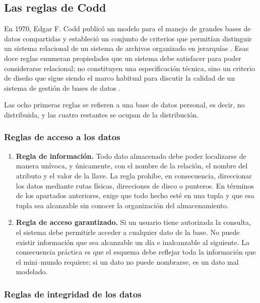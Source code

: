 \subsection{Las reglas de Codd}

En 1970, Edgar F. Codd publicó un modelo para el manejo de grandes bases de
datos compartidas y estableció un conjunto de criterios que permitían
distinguir un sistema relacional de un sistema de archivos organizado en
jerarquías \cite{codd1970relational}. Esas doce reglas enumeran propiedades
que un sistema debe satisfacer para poder considerarse relacional; no
constituyen una especificación técnica, sino un criterio de diseño que sigue
siendo el marco habitual para discutir la calidad de un sistema de gestión de
bases de datos \cite{elmasri2016fundamentals}.

Las ocho primeras reglas se refieren a una base de datos personal, es decir,
no distribuida, y las cuatro restantes se ocupan de la distribución.

\subsubsection*{Reglas de acceso a los datos}

\begin{enumerate}[leftmargin=1.9em,itemsep=0.55em]
  \item \textbf{Regla de información.} Todo dato almacenado debe poder
    localizarse de manera unívoca, y únicamente, con el nombre de la relación,
    el nombre del atributo y el valor de la llave. La regla prohíbe, en
    consecuencia, direccionar los datos mediante rutas físicas, direcciones de
    disco o punteros. En términos de los apartados anteriores, exige que todo
    hecho esté en una tupla y que esa tupla sea alcanzable sin conocer la
    organización del almacenamiento.
  \item \textbf{Regla de acceso garantizado.} Si un usuario tiene autorizada
    la consulta, el sistema debe permitirle acceder a cualquier dato de la
    base. No puede existir información que sea alcanzable un día e
    inalcanzable al siguiente. La consecuencia práctica es que el esquema debe
    reflejar toda la información que el mini--mundo requiere; si un dato no
    puede nombrarse, es un dato mal modelado.
\end{enumerate}

\subsubsection*{Reglas de integridad de los datos}


